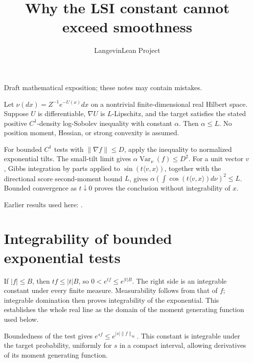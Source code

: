 \documentclass[11pt,a4paper]{article}
\title{\texorpdfstring{Why the LSI constant cannot exceed smoothness}{Why the LSI constant cannot exceed smoothness}}
\author{LangevinLean Project}
\date{}
\begin{document}
\maketitle
Draft mathematical exposition; these notes may contain mistakes.


Let \(\nu(dx)=Z^{-1}e^{-U(x)}dx\) on a nontrivial finite-dimensional real Hilbert space. Suppose \(U\) is differentiable, \(\nabla U\) is \(L\)-Lipschitz, and the target satisfies the stated positive \(C^1\)-density log-Sobolev inequality with constant \(\alpha\). Then \(\alpha\le L\). No position moment, Hessian, or strong convexity is assumed.



For bounded \(C^1\) tests with \(\|\nabla f\|\le D\), apply the inequality to normalized exponential tilts. The small-tilt limit gives \(\alpha\operatorname{Var}_\nu(f)\le D^2\). For a unit vector \(v\), Gibbs integration by parts applied to \(\sin(t\langle v,x\rangle)\), together with the directional score second-moment bound \(L\), gives \(\alpha(\int\cos(t\langle v,x\rangle)d\nu)^2\le L\). Bounded convergence as \(t\downarrow0\) proves the conclusion without integrability of \(x\).



Earlier results used here: \cite[Section~3.27]{LangevinLean2026ULASC}.

\section{\texorpdfstring{Integrability of bounded exponential tests}{Integrability of bounded exponential tests}}


If \(|f|\le B\), then \(tf\le |t|B\), so \(0<e^{tf}\le e^{|t|B}\). The right side is an integrable constant under every finite measure. Measurability follows from that of \(f\); integrable domination then proves integrability of the exponential. This establishes the whole real line as the domain of the moment generating function used below.



Boundedness of the test gives \(e^{sf}\le e^{|s|\|f\|_\infty}\). This constant is integrable under the target probability, uniformly for \(s\) in a compact interval, allowing derivatives of its moment generating function.
\end{document}
